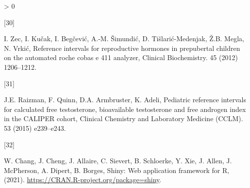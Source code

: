 \documentclass[]{elsarticle} %
\newlength{\csllabelwidth}
\newlength{\cslhangindent}
\newenvironment{CSLReferences}[3] %
 {%
  \setlength{\parindent}{0pt}
  \ifodd #1 \everypar{\setlength{\hangindent}{\cslhangindent}}\ignorespaces\fi
  \ifnum #2 > 0
  \setlength{\parskip}{#2\baselineskip}
  \fi
 }%
 {}
\newcommand{\CSLLeftMargin}[1]{\parbox[t]{\csllabelwidth}{#1}}
\newcommand{\CSLRightInline}[1]{\parbox[t]{\linewidth - \csllabelwidth}{#1}}
\begin{document}
\begin{CSLReferences}{0}{0}
\leavevmode\hypertarget{ref-zec2012reference}{}%
\CSLLeftMargin{{[}30{]} }
\CSLRightInline{I. Zec, I. Kučak, I. Begčević, A.-M. Šimundić, D.
Tišlarić-Medenjak, Ž.B. Megla, N. Vrkić, Reference intervals for
reproductive hormones in prepubertal children on the automated roche
cobas e 411 analyzer, Clinical Biochemistry. 45 (2012) 1206--1212.}

\leavevmode\hypertarget{ref-raizman2015pediatric}{}%
\CSLLeftMargin{{[}31{]} }
\CSLRightInline{J.E. Raizman, F. Quinn, D.A. Armbruster, K. Adeli,
Pediatric reference intervals for calculated free testosterone,
bioavailable testosterone and free androgen index in the CALIPER cohort,
Clinical Chemistry and Laboratory Medicine (CCLM). 53 (2015)
e239--e243.}

\leavevmode\hypertarget{ref-shiny}{}%
\CSLLeftMargin{{[}32{]} }
\CSLRightInline{W. Chang, J. Cheng, J. Allaire, C. Sievert, B.
Schloerke, Y. Xie, J. Allen, J. McPherson, A. Dipert, B. Borges, Shiny:
Web application framework for {R}, (2021).
\url{https://CRAN.R-project.org/package=shiny}.}

\end{CSLReferences}
\end{document}
